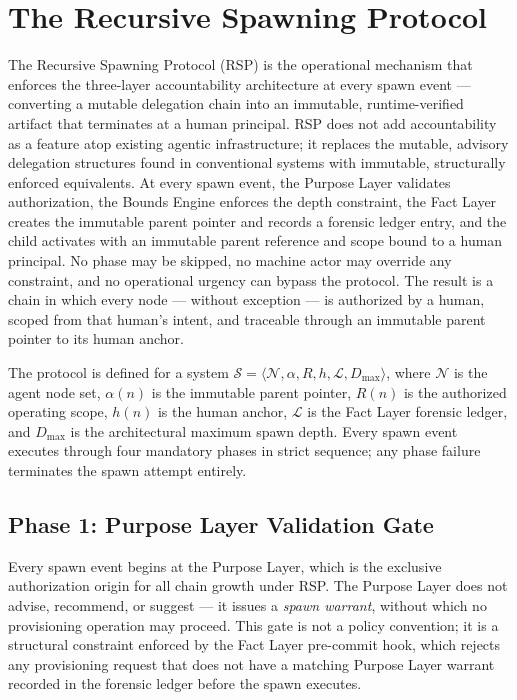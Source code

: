 \section{The Recursive Spawning Protocol}
\label{sec:rs-protocol}

The Recursive Spawning Protocol (RSP) is the operational mechanism that enforces the \bxthree{} three-layer accountability architecture at every spawn event — converting a mutable delegation chain into an immutable, runtime-verified artifact that terminates at a human principal. RSP does not add accountability as a feature atop existing agentic infrastructure; it replaces the mutable, advisory delegation structures found in conventional systems with immutable, structurally enforced equivalents. At every spawn event, the Purpose Layer validates authorization, the Bounds Engine enforces the depth constraint, the Fact Layer creates the immutable parent pointer and records a forensic ledger entry, and the child activates with an immutable parent reference and scope bound to a human principal. No phase may be skipped, no machine actor may override any constraint, and no operational urgency can bypass the protocol. The result is a chain in which every node — without exception — is authorized by a human, scoped from that human's intent, and traceable through an immutable parent pointer to its human anchor.

The protocol is defined for a system $\mathcal{S} = \langle \mathcal{N}, \alpha, R, h, \mathcal{L}, D_{\max} \rangle$, where $\mathcal{N}$ is the agent node set, $\alpha(n)$ is the immutable parent pointer, $R(n)$ is the authorized operating scope, $h(n)$ is the human anchor, $\mathcal{L}$ is the Fact Layer forensic ledger, and $D_{\max}$ is the architectural maximum spawn depth. Every spawn event executes through four mandatory phases in strict sequence; any phase failure terminates the spawn attempt entirely.

\subsection{Phase 1: Purpose Layer Validation Gate}

Every spawn event begins at the Purpose Layer, which is the exclusive authorization origin for all chain growth under RSP. The Purpose Layer does not advise, recommend, or suggest — it issues a \emph{spawn warrant}, without which no provisioning operation may proceed. This gate is not a policy convention; it is a structural constraint enforced by the Fact Layer pre-commit hook, which rejects any provisioning request that does not have a matching Purpose Layer warrant recorded in the forensic ledger before the spawn executes.

